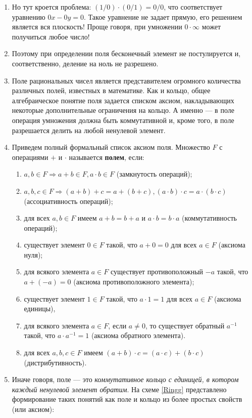 \begin{enumerate}
\item Но тут кроется проблема: $(1/0)\cdot(0/1)=0/0$, что соответствует уравнению $0x-0y=0$. Такое уравнение не задает прямую, его решением является вся плоскость! Проще говоря, при умножении $0\cdot\infty$ может получиться любое число!
\item Поэтому при определении поля бесконечный элемент не постулируется и, соответственно, деление на ноль не разрешено.
\item Поле рациональных чисел является представителем огромного количества различных полей, известных в математике. Как и кольцо, общее алгебраическое понятие поля задается списком аксиом, накладывающих некоторые дополнительные ограничения на кольцо. А именно --- в поле операция умножения должна быть коммутативной и, кроме того, в поле разрешается делить на любой ненулевой элемент.
\item Приведем полный формальный список аксиом поля. Множество $F$ с операциями $+$ и $\cdot$ называется \textbf{полем}, если:\label{FildAxiom}
\begin{enumerate}[{\bf F}1]
\item $a,b\in F\Rightarrow a+b\in F, a\cdot b\in F$ (замкнутость операций);
\item $a,b,c\in F\Rightarrow (a+b)+c=a+(b+c), (a\cdot b)\cdot c = a\cdot (b\cdot c)$ (ассоциативность операций);
\item для всех $a,b\in F$ имеем $a+b=b+a$ и $a\cdot b=b\cdot a$ (коммутативность операций);
\item существует элемент $0\in F$ такой, что $a+0=0$ для всех $a\in F$ (аксиома нуля);
\item для всякого элемента $a\in F$ существует противоположный $-a$ такой, что $a+(-a)=0$ (аксиома противоположного элемента);
\item существует элемент $1\in F$ такой, что $a\cdot 1=1$ для всех $a\in F$ (аксиома единицы),
\item для всякого элемента $a\in F$, если $a\ne 0$, то существует обратный $a^{-1}$ такой, что $a\cdot a^{-1}=1$ (аксиома обратного элемента).
\item для всех $a,b,c\in F$ имеем $(a+b)\cdot c=(a\cdot c)+(b\cdot c)$ (дистрибутивность).
\end{enumerate}
\item Иначе говоря, поле --- это \textit{коммутативное кольцо с единицей, в котором каждый ненулевой элемент обратим}. На схеме \ref{Ringg} представлено формирование таких понятий как поле и кольцо из более простых свойств (или аксиом):

\end{enumerate}
